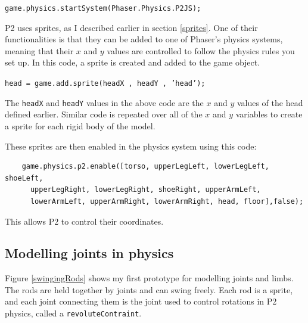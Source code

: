 \documentclass[12pt,a4paper,twoside,openright]{report}
\begin{document}
\begin{displayquote}
	\texttt{game.physics.startSystem(Phaser.Physics.P2JS);}	
\end{displayquote}

P2 uses sprites, as I described earlier in section \ref{sprites}. One of their functionalities is that they can be added to one of Phaser's physics systems, meaning that their $x$ and $y$ values are controlled to follow the physics rules you set up.
In this code, a sprite is created and added to the game object.

\begin{displayquote}
	\texttt{head = game.add.sprite(headX , headY , 'head');}
\end{displayquote}

The \texttt{headX} and \texttt{headY} values in the above code are the $x$ and $y$ values of the head defined earlier. Similar code is repeated over all of the $x$ and $y$ variables to create a sprite for each rigid body of the model.

These sprites are then enabled in the physics system using this code:

\begin{displayquote}
    \begin{verbatim}
	game.physics.p2.enable([torso, upperLegLeft, lowerLegLeft, shoeLeft,
      upperLegRight, lowerLegRight, shoeRight, upperArmLeft,
      lowerArmLeft, upperArmRight, lowerArmRight, head, floor],false);
    \end{verbatim}
\end{displayquote}

This allows P2 to control their coordinates.


\subsection{Modelling joints in physics}
\label{sec:jointsInPhysics}

Figure \ref{swingingRods} shows my first prototype for modelling joints and limbs. The rods are held together by joints and can swing freely. Each rod is a sprite, and each joint connecting them is the joint used to control rotations in P2 physics, called a \texttt{revoluteContraint}.
\end{document}
